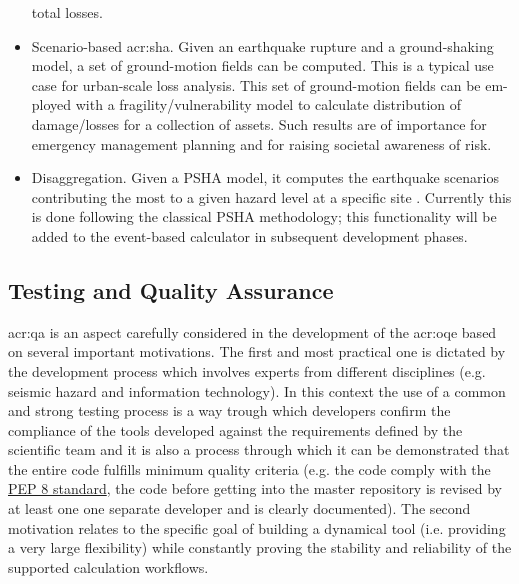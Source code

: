 \begin{itemize}
    total losses.
\item Scenario-based \gls{acr:sha}. Given an earthquake rupture and a 
    ground-shaking model, a set of ground-motion fields can be computed. 
    This is a typical use case for urban-scale loss analysis. This set of
    ground-motion fields can be em- ployed with a fragility/vulnerability 
    model to calculate distribution of damage/losses for a collection of
    assets. Such results are of importance for emergency management planning
    and for raising societal awareness of risk.
\item Disaggregation. Given a PSHA model, it computes the earthquake
    scenarios contributing the most to a given hazard level at a specific
    site \parencite{bazzurro1999}. Currently this is done following 
    the classical PSHA methodology; this functionality will be added to 
    the event-based calculator in subsequent development phases.
\end{itemize}
%
\subsection{Testing and Quality Assurance}
%
\gls{acr:qa} is an aspect carefully considered in the development 
of the \gls{acr:oqe} based on several important motivations.
%
The first and most practical one is dictated by the development process which 
involves experts from different disciplines (e.g. seismic hazard and 
information technology). 
%
In this context the use of a common and strong testing process is a way 
trough which developers confirm the compliance of the tools developed 
against the requirements defined by the scientific team and it is also 
a process through which it can be demonstrated that the entire code fulfills 
minimum quality criteria (e.g. the code comply with the
\href{http://legacy.python.org/dev/peps/pep-0008/}{PEP 8 standard}, the code
before getting into the master repository is revised by at least one one 
separate developer and is clearly documented).
% 
The second motivation relates to the specific goal of building a dynamical 
tool (i.e. providing a very large flexibility) while constantly proving the 
stability and reliability of the supported calculation workflows.

